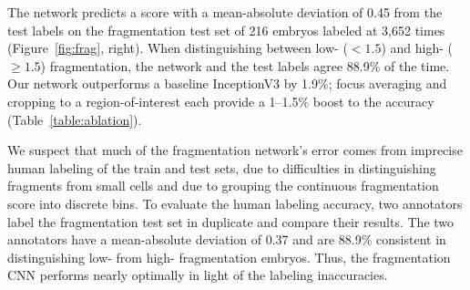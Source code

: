
 The network predicts a score with a mean-absolute deviation of 0.45 from the test labels on the fragmentation test set of 216 embryos labeled at 3,652 times (Figure~\ref{fig:frag}, right). When distinguishing between low- ($<1.5$) and high- ($\ge 1.5$) fragmentation, the network and the test labels agree 88.9\% of the time. Our network outperforms a baseline InceptionV3 by 1.9\%; focus averaging and cropping to a region-of-interest each provide a 1--1.5\% boost to the accuracy (Table~\ref{table:ablation}).

We suspect that much of the fragmentation network's error comes from imprecise human labeling of the train and test sets, due to difficulties in distinguishing fragments from small cells and due to grouping the continuous fragmentation score into discrete bins. To evaluate the human labeling accuracy, two annotators label the fragmentation test set in duplicate and compare their results. The two annotators have a mean-absolute deviation of 0.37 and are 88.9\% consistent in distinguishing low- from high- fragmentation embryos. Thus, the fragmentation CNN performs nearly optimally in light of the labeling inaccuracies.

